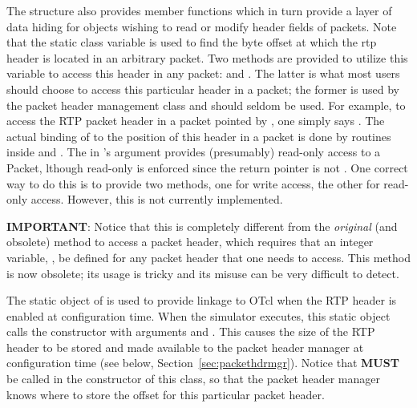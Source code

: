 The structure also provides member functions which in turn
provide a layer of data hiding for objects wishing to read
or modify header fields of packets.
Note that the static class variable  is used
to find the byte offset at which the rtp header is located
in an arbitrary \ns packet.
Two methods are provided to utilize this variable to access this
header in any packet:  and .
The latter is what most users should choose to access this particular
header in a packet; the former is used by the packet header management
class and should seldom be used.
For example, to access the RTP packet header in a packet pointed by
, one simply says .
The actual binding of  to the position of this header in
a packet is done by routines inside  and
.
The  in 's argument provides (presumably)
read-only access to a  Packet, lthough read-only is
enforced since the return pointer is not . 
One correct way to do this is to provide two methods, one for write
access, the other for read-only access.
However, this is not currently implemented.

{\bf IMPORTANT}: Notice that this is completely different from the
{\em original} (and obsolete) method to access a packet header, which
requires that an 
integer variable, , be defined for any packet
header that one needs to access.
This method is now obsolete; its usage is tricky and its misuse can
be very difficult to detect. 


The static object  of
is used to provide linkage to OTcl when the RTP header is
enabled at configuration time.
When the simulator executes, this static object calls
the  constructor with arguments
 and .
This causes the size of the RTP header to be stored
and made available to the packet header manager
at configuration time (see below, Section~\ref{sec:packethdrmgr}).
Notice that  {\bf MUST} be called in the 
constructor of this class, so that the packet
header manager knows where to store the offset for this particular
packet header. 

